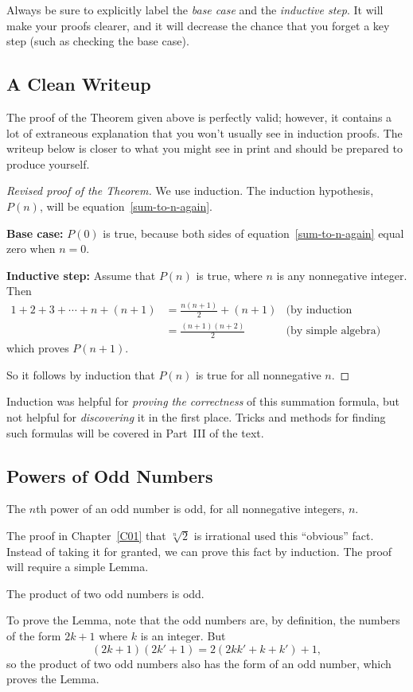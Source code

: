 Always be sure to explicitly label the \emph{base case} and
the \emph{inductive step}.  It will make your proofs clearer, and it
will decrease the chance that you forget a key step (such as checking
the base case).

\subsection{A Clean Writeup}

The proof of the Theorem given above is perfectly valid; however, it
contains a lot of extraneous explanation that you won't usually see in
induction proofs.  The writeup below is closer to what you might see
in print and should be prepared to produce yourself.

\begin{proof}[Revised proof of the Theorem]
We use induction.  The induction hypothesis, $P(n)$, will be
equation~\eqref{sum-to-n-again}.

\textbf{Base case:} $P(0)$ is true, because both sides of
equation~\eqref{sum-to-n-again} equal zero when $n=0$.

\textbf{Inductive step:} Assume that $P(n)$ is true, where
$n$ is any nonnegative integer.  Then
\begin{align*}
1 + 2 + 3 + \cdots + n + (n+1)
    & = \frac{n(n+1)}{2} + (n+1) & \text{(by induction hypothesis)}\\
    & = \frac{(n+1)(n+2)}{2}  & \text{(by simple algebra)}
\end{align*}
which proves $P(n+1)$.

So it follows by induction that $P(n)$ is true for all nonnegative $n$.
\end{proof}

Induction was helpful for \emph{proving the correctness} of this
summation formula, but not helpful for \emph{discovering} it in the
first place.  Tricks and methods for finding such formulas will be
covered in Part~III of the text.  %


\iffalse
\subsection{Powers of Odd Numbers}

\begin{fact*}
The $n$th power of an odd number is odd, for all nonnegative integers, $n$.
\end{fact*}
The proof in Chapter~\ref{C01} that $\sqrt[n]{2}$ is irrational used this 
``obvious'' fact.  Instead of taking it for granted, we can prove this fact
by induction.
The proof will require a simple Lemma.
\begin{lemma*}
The product of two odd numbers is odd.
\end{lemma*}
To prove the Lemma, note that the odd numbers are, by definition, the
numbers of the form $2k+1$ where $k$ is an integer.  But
\[
(2k+1)(2k'+1) = 2(2kk' + k + k')+1,
\]
so the product of two odd numbers also has the form of an odd number,
which proves the Lemma.

